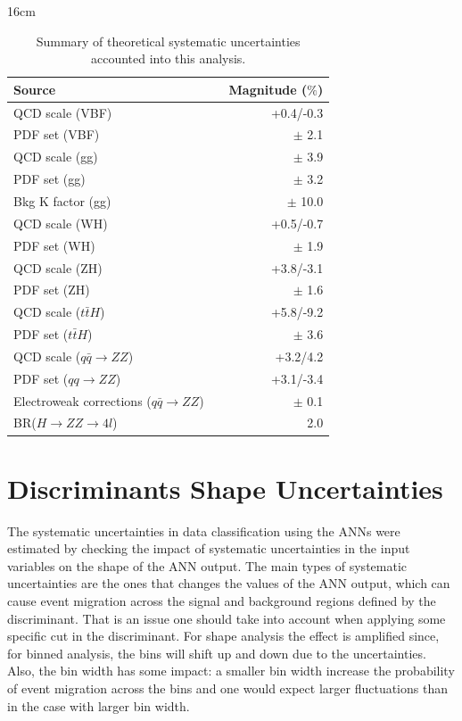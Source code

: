 \begin{table}[hbtp]{16cm}
	\label{tab:theorical_systematic_uncertainties}
	\caption{Summary of theoretical systematic uncertainties accounted into this analysis.}
	\centering
	\begin{tabular}{lcr}
		\hline
		\rowcolor{light_gray}
		Source && Magnitude ($\%$)\\
		\hline
		QCD scale (VBF)                                      && +0.4/-0.3\\
		PDF set (VBF)                                        && $\pm$ 2.1\\
		\hline
		QCD scale (gg)                                       && $\pm$ 3.9\\
		PDF set (gg)                                         && $\pm$ 3.2\\
		Bkg K factor (gg)                                    && $\pm$ 10.0\\
		QCD scale (WH)                                       && +0.5/-0.7\\
		PDF set (WH)                                         && $\pm$ 1.9\\
		QCD scale (ZH)                                       && +3.8/-3.1\\
		PDF set (ZH)                                         && $\pm$ 1.6\\
		QCD scale ($t\bar{t}H$)                              && +5.8/-9.2\\
		PDF set ($t\bar{t}H$)                                && $\pm$ 3.6\\
		QCD scale ($q\bar{q} \rightarrow ZZ$)                && +3.2/4.2\\
		PDF set ($qq \rightarrow ZZ$)                        && +3.1/-3.4\\
		Electroweak corrections ($q\bar{q} \rightarrow ZZ$)  && $\pm$ 0.1\\
		BR($H \rightarrow ZZ \rightarrow 4l$)                && 2.0\\
		\hline
	\end{tabular}
\end{table}


\section{Discriminants Shape Uncertainties}
\label{subsec:discriminants_shape_uncertainties}
The systematic uncertainties in data classification using the ANNs were estimated by checking the impact of systematic uncertainties in the input variables on the shape of the ANN output. The main types of systematic uncertainties are the ones that changes the values of the ANN output, which can cause event migration across the signal and background regions defined by the discriminant. That is an issue one should take into account when applying some specific cut in the discriminant. For shape analysis the effect is amplified since, for binned analysis, the bins will shift up and down due to the uncertainties. Also, the bin width has some impact: a smaller bin width increase the probability of event migration across the bins and one would expect larger fluctuations than in the case with larger bin width.

